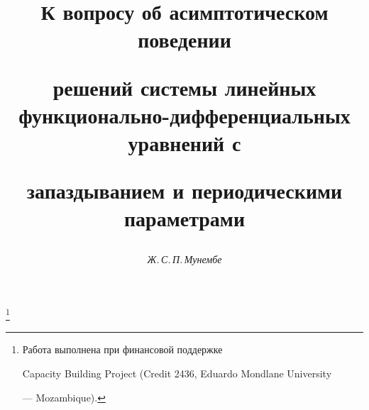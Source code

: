 






\newcommand{\eqdef}{\overset{\mathrm{def}}{=}{}}


\newcommand{\spc}[1]{\bold #1}


\newcommand{\vraisup}{\operatornamewithlimits{vrai\,sup}}


\newcommand{\tts}[1]{}


\renewcommand{\baselinestretch}{0.96}







\setcounter{page}{28}















\author{\it Ж.\,С.\,П.\,Мунембе}




\title{К вопросу об асимптотическом поведении


решений системы линейных функционально-дифференциальных уравнений с


запаздыванием и периодическими параметрами}


\thanks{Работа выполнена при финансовой поддержке


Capacity Building Project (Credit 2436, Eduardo Mondlane University


--- Mozambique).}





\date{}


